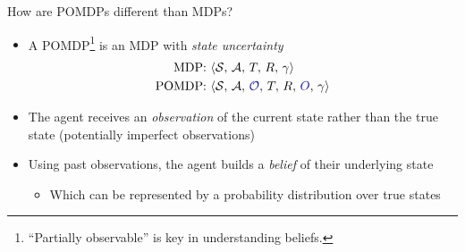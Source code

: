 
\begin{frame}[fragile]{How are POMDPs different than MDPs?}

\begin{itemize}
    \item A POMDP\footnote{``Partially observable'' is key in understanding beliefs.} is an MDP with \textit{state uncertainty}
    \begin{align*}
        \text{MDP: }& \langle \mathcal{S},\, \mathcal{A},\, T,\, R,\, \gamma \rangle\\
        \text{POMDP: }& \langle \mathcal{S},\, \mathcal{A},\, {\color{darkblue}\mathcal{O}},\, T,\, R,\, {\color{darkblue}O},\, \gamma \rangle
    \end{align*}
    \item The agent receives an \textit{observation} of the current state rather than the true state (potentially imperfect observations)
    \item Using past observations, the agent builds a \textit{belief} of their underlying state
    \begin{itemize}
        \item Which can be represented by a probability distribution over true states
    \end{itemize}
\end{itemize}

\end{frame}


